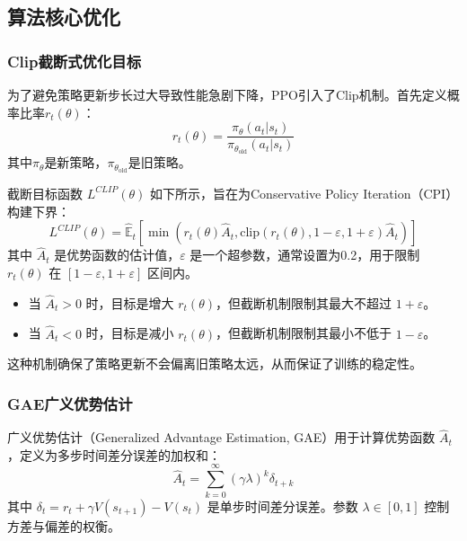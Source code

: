 \documentclass[11pt]{article}
\begin{document}
    
    \subsection{算法核心优化}
    \subsubsection{Clip截断式优化目标}
    为了避免策略更新步长过大导致性能急剧下降，PPO引入了Clip机制。首先定义概率比率$r_t(\theta)$：
    \begin{equation}
        r_t(\theta) = \frac{\pi_\theta(a_t|s_t)}{\pi_{\theta_{\text{old}}}(a_t|s_t)}
    \end{equation}
    其中$\pi_\theta$是新策略，$\pi_{\theta_{\text{old}}}$是旧策略。
    
    截断目标函数 $L^{CLIP}(\theta)$ 如下所示，旨在为Conservative Policy Iteration（CPI）构建下界：
    \begin{equation} 
        L^{CLIP}(\theta) = \hat{\mathbb{E}}_t \left[ \min(r_t(\theta)\hat{A}_t, \text{clip}(r_t(\theta), 1-\varepsilon, 1+\varepsilon)\hat{A}_t) \right]
    \end{equation}
    其中 $\hat{A}_t$ 是优势函数的估计值，$\varepsilon$ 是一个超参数，通常设置为0.2，用于限制 $r_t(\theta)$ 在 $[1-\varepsilon, 1+\varepsilon]$ 区间内。
    \begin{itemize}
        \item 当 $\hat{A}_t > 0$ 时，目标是增大 $r_t(\theta)$，但截断机制限制其最大不超过 $1+\varepsilon$。
        \item 当 $\hat{A}_t < 0$ 时，目标是减小 $r_t(\theta)$，但截断机制限制其最小不低于 $1-\varepsilon$。
    \end{itemize}
    这种机制确保了策略更新不会偏离旧策略太远，从而保证了训练的稳定性。
    \subsubsection{GAE广义优势估计}
    广义优势估计（Generalized Advantage Estimation, GAE）用于计算优势函数 $\hat{A}_t$，定义为多步时间差分误差的加权和：
    \begin{equation}
        \hat{A}_t = \sum_{k=0}^{\infty} (\gamma\lambda)^k \delta_{t+k}
    \end{equation}
    其中 $\delta_t = r_t + \gamma V(s_{t+1}) - V(s_t)$ 是单步时间差分误差。参数 $\lambda \in [0,1]$ 控制方差与偏差的权衡。
\end{document}
